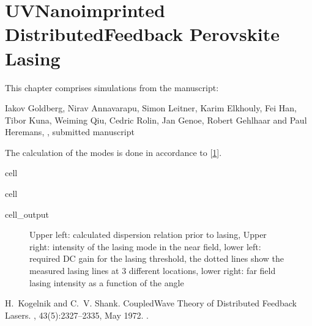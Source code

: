 \documentclass[a4paper,10pt,english,openany,oneside]{jupyterBook}
\begin{document}
\chapter{UV\sphinxhyphen{}Nanoimprinted Distributed\sphinxhyphen{}Feedback Perovskite Lasing}
\label{\detokenize{NanoimprintedDFB:uv-nanoimprinted-distributed-feedback-perovskite-lasing}}\label{\detokenize{NanoimprintedDFB::doc}}
\sphinxAtStartPar
This chapter comprises simulations from the manuscript:

\sphinxAtStartPar
Iakov Goldberg, Nirav Annavarapu, Simon Leitner, Karim Elkhouly, Fei Han, Tibor Kuna, Weiming Qiu, Cedric Rolin, Jan Genoe, Robert Gehlhaar and Paul Heremans, , submitted manuscript

\sphinxAtStartPar
The calculation of the modes is done in accordance to {[}\hyperlink{cite.bib:id3}{1}{]}.

\begin{sphinxuseclass}{cell}
\end{sphinxuseclass}
\begin{sphinxuseclass}{cell}\begin{sphinxVerbatimOutput}

\begin{sphinxuseclass}{cell_output}
\begin{figure}[htbp]
\centering
\capstart

\noindent{}
\caption{Upper left: calculated dispersion relation prior to lasing, Upper right: intensity of the lasing mode in the near field, lower left: required DC gain for the lasing threshold, the dotted lines show the measured lasing lines at 3 different locations, lower right: far field lasing intensity as a function of the angle}\label{\detokenize{NanoimprintedDFB:iakov1}}\end{figure}

\end{sphinxuseclass}\end{sphinxVerbatimOutput}

\end{sphinxuseclass}
\sphinxstepscope

\begin{sphinxthebibliography}{1}
\sphinxAtStartPar
H. Kogelnik and C. V. Shank. Coupled\sphinxhyphen{}Wave Theory of Distributed Feedback Lasers. , 43(5):2327–2335, May 1972. .
\end{sphinxthebibliography}







\renewcommand{\indexname}{Index}
\printindex
\end{document}
